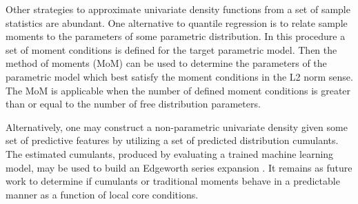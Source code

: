 Other strategies to approximate univariate density functions from a set of sample statistics are abundant.  One alternative to quantile regression is to relate sample moments to the parameters of some parametric distribution.  In this procedure a set of moment conditions is defined for the target parametric model.  Then the method of moments (MoM) can be used to determine the parameters of the parametric model which best satisfy the moment conditions in the L2 norm sense.  The MoM is applicable when the number of defined moment conditions is greater than or equal to the number of free distribution parameters.

Alternatively, one may construct a non-parametric univariate density given some set of predictive features by utilizing a set of predicted distribution cumulants.  The estimated cumulants, produced by evaluating a trained machine learning model, may be used to build an Edgeworth series expansion \cite{hall1997}.  It remains as future work to determine if cumulants or traditional moments behave in a predictable manner as a function of local core conditions.



